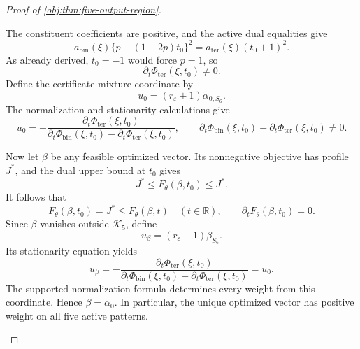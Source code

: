 \begin{proof}[Proof of \cref{obj:thm:five-output-region}]
\begin{enumerate}
The constituent coefficients are positive, and the active dual
equalities give
\[
a_{\mathrm{bin}}(\xi)\{p-(1-2p)t_0\}^2
=
a_{\mathrm{ter}}(\xi)(t_0+1)^2.
\]
As already derived, \(t_0=-1\) would force \(p=1\), so
\[
\partial_t\Phi_{\mathrm{ter}}(\xi,t_0)\ne0.
\]
Define the certificate mixture coordinate by
\[
u_0=(r_\varepsilon+1)\alpha_{0,S_6}.
\]
The normalization and stationarity calculations give
\[
u_0
=
-\frac{\partial_t\Phi_{\mathrm{ter}}(\xi,t_0)}
       {\partial_t\Phi_{\mathrm{bin}}(\xi,t_0)
        -\partial_t\Phi_{\mathrm{ter}}(\xi,t_0)},
\qquad
\partial_t\Phi_{\mathrm{bin}}(\xi,t_0)
-\partial_t\Phi_{\mathrm{ter}}(\xi,t_0)\ne0.
\]

Now let \(\beta\) be any feasible optimized vector. Its nonnegative
objective has profile \(J^*\), and the dual upper bound at \(t_0\) gives
\[
J^*\le F_\theta(\beta,t_0)\le J^*.
\]
It follows that
\[
F_\theta(\beta,t_0)=J^*
\le F_\theta(\beta,t)\quad(t\in\mathbb R),
\qquad
\partial_tF_\theta(\beta,t_0)=0.
\]
Since \(\beta\) vanishes outside \(\mathcal K_5\), define
\[
u_\beta=(r_\varepsilon+1)\beta_{S_6}.
\]
Its stationarity equation yields
\[
u_\beta
=
-\frac{\partial_t\Phi_{\mathrm{ter}}(\xi,t_0)}
       {\partial_t\Phi_{\mathrm{bin}}(\xi,t_0)
        -\partial_t\Phi_{\mathrm{ter}}(\xi,t_0)}
=u_0.
\]
The supported normalization formula determines every weight from this
coordinate. Hence \(\beta=\alpha_0\). In particular, the unique optimized
vector has positive weight on all five active patterns.


\end{enumerate}
\end{proof}

